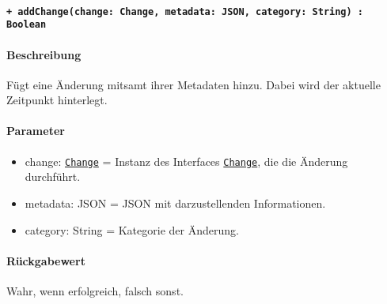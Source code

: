 \paragraph{\texttt{+ addChange(change: Change, metadata: JSON, category: String) : Boolean}}\label{AP_Framework_addChange}%
\paragraph*{Beschreibung}
Fügt eine Änderung mitsamt ihrer Metadaten hinzu.
Dabei wird der aktuelle Zeitpunkt hinterlegt.
\paragraph*{Parameter}
\begin{itemize}
    \item change: \hyperref[AP_Change]{\texttt{Change}} = Instanz des Interfaces \hyperref[AP_Change]{\texttt{Change}}, die die Änderung durchführt.
    \item metadata: JSON = JSON mit darzustellenden Informationen.
    \item category: String = Kategorie der Änderung.
\end{itemize}
\paragraph*{Rückgabewert}
Wahr, wenn erfolgreich, falsch sonst.
